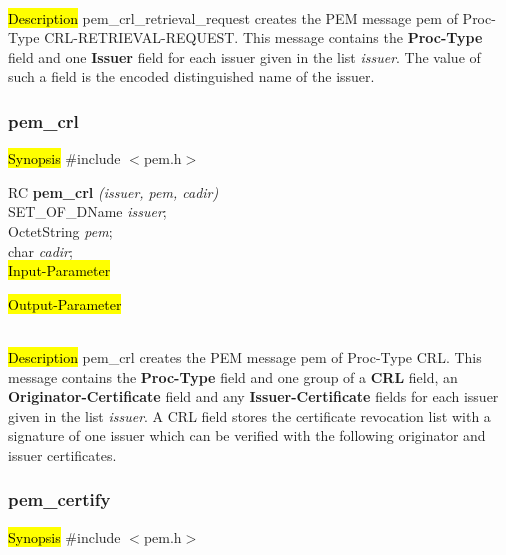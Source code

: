  \\
\hl{Description}
pem\_crl\_retrieval\_request creates the PEM message pem of Proc-Type CRL-RETRIEVAL-REQUEST.
This message contains the {\bf Proc-Type } field and one {\bf Issuer} field
for each issuer given in the list {\em issuer}. The value of such a field is the
encoded distinguished name of the issuer.

\subsubsection{pem\_crl}
\label{pem_crl}
\hl{Synopsis}
\#include $<$pem.h$>$ 

RC {\bf pem\_crl} {\em (issuer, pem, cadir)} \\
SET\_OF\_DName {\em *issuer}; \\
OctetString {\em *pem}; \\
char {\em *cadir}; \\
\hl{Input-Parameter}


\hl{Output-Parameter}

 \\
\hl{Description}
pem\_crl creates the PEM message pem of Proc-Type CRL.
This message contains the {\bf Proc-Type } field and one group of a {\bf CRL} field,
an {\bf Originator-Certificate} field and any {\bf Issuer-Certificate} fields
for each issuer given in the list {\em issuer}. A CRL field stores the certificate
revocation list with a signature of one issuer which can be verified with the following
originator and issuer certificates.

\subsubsection{pem\_certify}
\label{pem_certify}
\hl{Synopsis}
\#include $<$pem.h$>$ 

